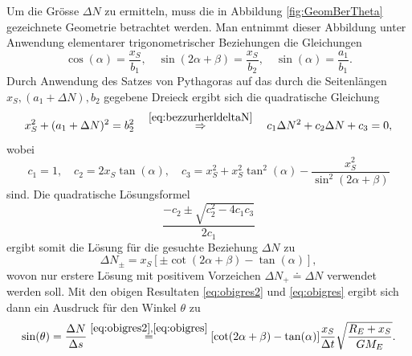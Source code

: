 \documentclass[a4paper,12pt]{article}
\numberwithin{equation}{section}
\begin{document}
Um die Grösse $\Delta N$ zu ermitteln, muss die in Abbildung \ref{fig:GeomBerTheta} gezeichnete Geometrie betrachtet werden. Man entnimmt dieser Abbildung unter Anwendung elementarer trigonometrischer Beziehungen die Gleichungen \begin{equation}\label{eq:bezzurherldeltaN}
\cos(\alpha) = \frac{x_S}{b_1}, \quad \sin(2\alpha + \beta) = \frac{x_S}{b_2}, \quad \sin(\alpha) = \frac{a_1}{b_1}.
\end{equation} Durch Anwendung des Satzes von Pythagoras auf das durch die Seitenlängen $x_S, (a_1+\Delta N), b_2$ gegebene Dreieck ergibt sich die quadratische Gleichung \begin{equation}
x_S^2 + (a_1 + \Delta N)^2 = b_2^2 \quad \overset{\eqref{eq:bezzurherldeltaN}}{\Rightarrow} \quad c_1\Delta N^2 + c_2 \Delta N + c_3 = 0,
\end{equation} wobei \begin{equation}
c_1 = 1, \quad c_2 = 2x_S\tan(\alpha), \quad c_3 = x_S^2+x_S^2\tan^2(\alpha)-\frac{x_S^2}{\sin^2(2\alpha+\beta)}
\end{equation} sind. Die quadratische Lösungsformel \begin{equation}
\frac{-c_2 \pm \sqrt{c_2^2-4c_1c_3}}{2c_1}
\end{equation} ergibt somit die Lösung für die gesuchte Beziehung $\Delta N$ zu \begin{equation}
\Delta N_{\pm} = x_S[\pm \cot(2\alpha+\beta)-\tan(\alpha)],
\end{equation} wovon nur erstere Lösung mit positivem Vorzeichen $\Delta N_{+} \doteq \Delta N$ verwendet werden soll. Mit den obigen Resultaten \eqref{eq:obigres2} und \eqref{eq:obigres} ergibt sich dann ein Ausdruck für den Winkel $\theta$ zu \begin{equation}\label{eq:restrictionontheta}
\sin(\theta) = \frac{\Delta N}{\Delta s} \overset{\eqref{eq:obigres2},\eqref{eq:obigres}}{=} [ \cot(2\alpha+\beta)-\tan(\alpha)]\frac{x_S}{\Delta t}\sqrt{\frac{R_E+x_S}{GM_E}}.
\end{equation}
\end{document}
